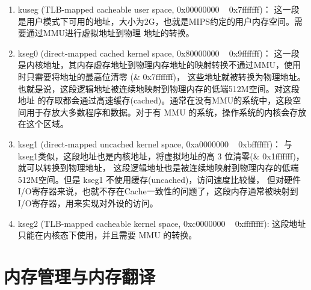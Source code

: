 \begin{enumerate}
  \item kuseg (TLB-mapped cacheable user space, 0x00000000 ~ 0x7fffffff)：
  这一段是用户模式下可用的地址，大小为2G，也就是MIPS约定的用户内存空间。需要通过MMU进行虚拟地址到物理
  地址的转换。
  \item kseg0 (direct-mapped cached kernel space, 0x80000000 ~ 0x9fffffff)：
  这一段是内核地址，其内存虚存地址到物理内存地址的映射转换不通过MMU，使用时只需要将地址的最高位清零
  (\& 0x7fffffff)，
  这些地址就被转换为物理地址。也就是说，这段逻辑地址被连续地映射到物理内存的低端512M空间。对这段地址
  的存取都会通过高速缓存(cached)。通常在没有MMU的系统中，这段空间用于存放大多数程序和数据。对于有
  MMU 的系统，操作系统的内核会存放在这个区域。
  \item kseg1 (direct-mapped uncached kernel space, 0xa0000000 ~ 0xbfffffff)：
  与kseg1类似，这段地址也是内核地址，将虚拟地址的高 3 位清零(\& 0x1fffffff)，就可以转换到物理地址，
  这段逻辑地址也是被连续地映射到物理内存的低端512M空间。但是 kseg1 不使用缓存(uncached)，访问速度比较慢，
  但对硬件I/O寄存器来说，也就不存在Cache一致性的问题了，这段内存通常被映射到I/O寄存器，用来实现对外设的访问。
  \item kseg2 (TLB-mapped cacheable kernel space, 0xc0000000 ~ 0xffffffff):
  这段地址只能在内核态下使用，并且需要 MMU 的转换。
\end{enumerate}

\section{内存管理与内存翻译}

